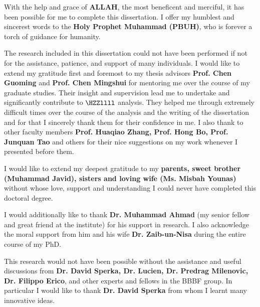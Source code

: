
\begin{acknowledgements}
\addchaptertocentry{\acknowledgementname} %
	\par With the help and grace of \textbf{ALLAH}, the
most beneficent and merciful, it has been possible for me to
complete this dissertation. I offer my humblest and sincerest words
	to the \textbf{Holy Prophet Muhammad (PBUH)}, who is
forever a torch of guidance for humanity. 

	The research included in this dissertation could not have been performed if not for the assistance, patience, and support of many individuals.  I would like to extend my gratitude first and foremost to my thesis advisors \textbf{Prof. Chen Guoming} and \textbf{Prof. Chen Mingshui} for mentoring me over the course of my graduate studies.  
	Their insight and supervision lead me to undertake and significantly contribute to $\HZZllll$ analysis. They helped me through extremely difficult times over the course of the analysis and the writing of the dissertation and for that I sincerely thank them for their confidence in me. I also thank to other faculty members \textbf{Prof. Huaqiao Zhang, Prof. Hong Bo,  Prof. Junquan Tao} and others for their nice suggestions on my work whenever I presented before them.

I would like to extend my deepest gratitude to my \textbf{parents, sweet brother (Muhammad Javid), sisters and loving wife (Ms. Misbah Younas)} without whose love, support and understanding I could never have completed this doctoral degree.

	I would additionally like to thank \textbf{Dr. Muhammad Ahmad} (my senior fellow and great friend at the institute) for his support in research. I also acknowledge the moral support from him and his wife \textbf{Dr. Zaib-un-Nisa} during the entire course of my PhD. %

	This research would not have been possible without the assistance and useful discussions from \textbf{Dr. David Sperka, Dr. Lucien, Dr. Predrag Milenovic, Dr. Filippo Erico}, and other experts and fellows in the BBBF group. 
	In particular I would like to thank \textbf{Dr. David Sperka} from whom I learnt many innovative ideas. %


\end{acknowledgements}
